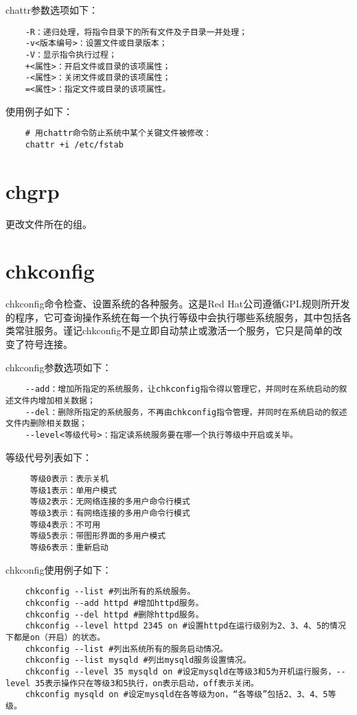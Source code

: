 \documentclass[a4paper,left=2.5cm,right=2.5cm,11pt]{article}
\begin{document}
	chattr参数选项如下：
	\begin{lstlisting}
	-R：递归处理，将指令目录下的所有文件及子目录一并处理； 
	-v<版本编号>：设置文件或目录版本； 
	-V：显示指令执行过程； 
	+<属性>：开启文件或目录的该项属性； 
	-<属性>：关闭文件或目录的该项属性； 
	=<属性>：指定文件或目录的该项属性。
	\end{lstlisting}

	使用例子如下：
	\begin{lstlisting}
	# 用chattr命令防止系统中某个关键文件被修改：
	chattr +i /etc/fstab
	\end{lstlisting}

\section{chgrp}
	更改文件所在的组。

\section{chkconfig}
	chkconfig命令检查、设置系统的各种服务。这是Red Hat公司遵循GPL规则所开发的程序，它可查询操作系统在每一个执行等级中会执行哪些系统服务，其中包括各类常驻服务。谨记chkconfig不是立即自动禁止或激活一个服务，它只是简单的改变了符号连接。\par

	chkconfig参数选项如下：
	\begin{lstlisting}
	--add：增加所指定的系统服务，让chkconfig指令得以管理它，并同时在系统启动的叙述文件内增加相关数据； 
	--del：删除所指定的系统服务，不再由chkconfig指令管理，并同时在系统启动的叙述文件内删除相关数据； 
	--level<等级代号>：指定读系统服务要在哪一个执行等级中开启或关毕。
	\end{lstlisting}

	等级代号列表如下：
	\begin{lstlisting}
	 等级0表示：表示关机 
	 等级1表示：单用户模式 
	 等级2表示：无网络连接的多用户命令行模式 
	 等级3表示：有网络连接的多用户命令行模式 
	 等级4表示：不可用 
	 等级5表示：带图形界面的多用户模式 
	 等级6表示：重新启动
	\end{lstlisting}

	chkconfig使用例子如下：
	\begin{lstlisting}
	chkconfig --list #列出所有的系统服务。 
	chkconfig --add httpd #增加httpd服务。 
	chkconfig --del httpd #删除httpd服务。 
	chkconfig --level httpd 2345 on #设置httpd在运行级别为2、3、4、5的情况下都是on（开启）的状态。 
	chkconfig --list #列出系统所有的服务启动情况。 
	chkconfig --list mysqld #列出mysqld服务设置情况。 
	chkconfig --level 35 mysqld on #设定mysqld在等级3和5为开机运行服务，--level 35表示操作只在等级3和5执行，on表示启动，off表示关闭。 
	chkconfig mysqld on #设定mysqld在各等级为on，“各等级”包括2、3、4、5等级。
	\end{lstlisting}
\end{document}
